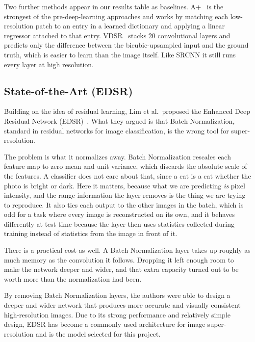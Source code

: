\documentclass[a4paper,11pt]{article}
\begin{document}
Two further methods appear in our results table as baselines. A+~\cite{timofte2014} is the
strongest of the pre-deep-learning approaches and works by matching each low-resolution patch
to an entry in a learned dictionary and applying a linear regressor attached to that entry.
VDSR~\cite{kim2016} stacks 20 convolutional layers and predicts only the difference between the
bicubic-upsampled input and the ground truth, which is easier to learn than the image itself.
Like SRCNN it still runs every layer at high resolution.

\subsection{State-of-the-Art (EDSR)}\label{sec:edsr}
Building on the idea of residual learning, Lim et al.\ proposed the Enhanced Deep
Residual Network (EDSR)~\cite{lim2017}. What they argued is that Batch Normalization,
standard in residual networks for image classification, is the wrong tool for
super-resolution.

The problem is what it normalizes away. Batch Normalization rescales each feature map to
zero mean and unit variance, which discards the absolute scale of the features. A
classifier does not care about that, since a cat is a cat whether the photo is bright or
dark. Here it matters, because what we are predicting \emph{is} pixel intensity, and the
range information the layer removes is the thing we are trying to reproduce. It also ties
each output to the other images in the batch, which is odd for a task where every image is
reconstructed on its own, and it behaves differently at test time because the layer then
uses statistics collected during training instead of statistics from the image in front of
it.

There is a practical cost as well. A Batch Normalization layer takes up roughly as much
memory as the convolution it follows. Dropping it left enough room to make the network
deeper and wider, and that extra capacity turned out to be worth more than the
normalization had been.

\medskip


By removing Batch Normalization layers, the authors were able to design a deeper
and wider network that produces more accurate and visually consistent high-resolution
images. Due to its strong performance and relatively simple design, EDSR has become
a commonly used architecture for image super-resolution and is the model selected
for this project.
\end{document}

